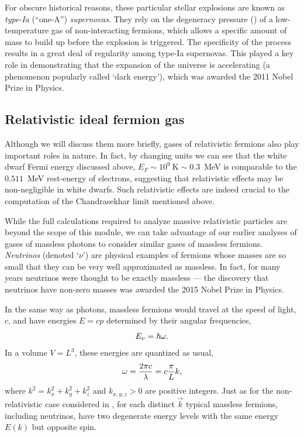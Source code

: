 For obscure historical reasons, these particular stellar explosions are known as \textit{type-{\textrm I}a} (``one-A'') \textit{supernovas}.
They rely on the degeneracy pressure () of a low-temperature gas of non-interacting fermions, which allows a specific amount of mass to build up before the explosion is triggered.
The specificity of the process results in a great deal of regularity among type-{\textrm I}a supernovas.
This played a key role in demonstrating that the expansion of the universe is accelerating (a phenomenon popularly called `dark energy'), which was awarded the 2011 Nobel Prize in Physics.



\subsection{Relativistic ideal fermion gas}
Although we will discuss them more briefly, gases of relativistic fermions also play important roles in nature.
In fact, by changing units we can see that the white dwarf Fermi energy discussed above, $E_F \sim 10^9~\text{K} \sim 0.3$~MeV is comparable to the $0.511$~MeV rest-energy of electrons, suggesting that relativistic effects may be non-negligible in white dwarfs. %
Such relativistic effects are indeed crucial to the computation of the Chandrasekhar limit mentioned above.

While the full calculations required to analyze massive relativistic particles are beyond the scope of this module, we can take advantage of our earlier analyses of gases of massless photons to consider similar gases of massless fermions.
\textit{Neutrinos} (denoted `$\nu$') are physical examples of fermions whose masses are so small that they can be very well approximated as massless.
In fact, for many years neutrinos were thought to be exactly massless --- the discovery that neutrinos have non-zero masses was awarded the 2015 Nobel Prize in Physics.

In the same way as photons, massless fermions would travel at the speed of light, $c$, and have energies $E = cp$ determined by their angular frequencies,
\begin{equation*}
  E_{\nu} = \hbar \omega.
\end{equation*}
In a volume $V = L^3$, these energies are quantized as usual,
\begin{equation*}
  \omega = \frac{2\pi c}{\lambda} = c \frac{\pi}{L} k,
\end{equation*}
where $k^2 = k_x^2 + k_y^2 + k_z^2$ and $k_{x, y, z} > 0$ are positive integers.
Just as for the non-relativistic case considered in , for each distinct $\vec k$ typical massless fermions, including neutrinos, have two degenerate energy levels with the same energy $E(k)$ but opposite spin.


